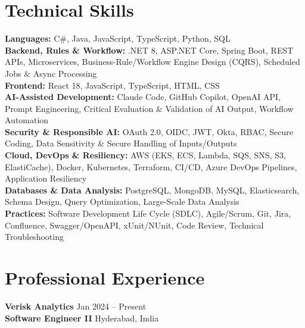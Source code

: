 \documentclass[a4paper,10pt]{article}
\begin{document}
\section*{Technical Skills}
\begin{sloppypar}
\noindent
\textbf{Languages:} C\#, Java, JavaScript, TypeScript, Python, SQL \\
\textbf{Backend, Rules \& Workflow:} .NET 8, ASP.NET Core, Spring Boot, REST APIs, Microservices, Business-Rule/Workflow Engine Design (CQRS), Scheduled Jobs \& Async Processing \\
\textbf{Frontend:} React 18, JavaScript, TypeScript, HTML, CSS \\
\textbf{AI-Assisted Development:} Claude Code, GitHub Copilot, OpenAI API, Prompt Engineering, Critical Evaluation \& Validation of AI Output, Workflow Automation \\
\textbf{Security \& Responsible AI:} OAuth 2.0, OIDC, JWT, Okta, RBAC, Secure Coding, Data Sensitivity \& Secure Handling of Inputs/Outputs \\
\textbf{Cloud, DevOps \& Resiliency:} AWS (EKS, ECS, Lambda, SQS, SNS, S3, ElastiCache), Docker, Kubernetes, Terraform, CI/CD, Azure DevOps Pipelines, Application Resiliency \\
\textbf{Databases \& Data Analysis:} PostgreSQL, MongoDB, MySQL, Elasticsearch, Schema Design, Query Optimization, Large-Scale Data Analysis \\
\textbf{Practices:} Software Development Life Cycle (SDLC), Agile/Scrum, Git, Jira, Confluence, Swagger/OpenAPI, xUnit/NUnit, Code Review, Technical Troubleshooting
\end{sloppypar}

\section*{Professional Experience}

\textbf{Verisk Analytics} \hfill Jan 2024 -- Present \\
\textbf{Software Engineer II} \hfill Hyderabad, India
\end{document}
